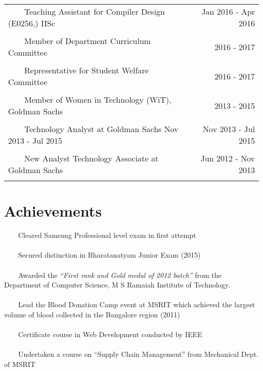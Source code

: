 \documentclass[a4paper,10pt]{article} %
\newcommand{\tabitem}{~~\llap{\textbullet}~~}
\begin{document}
\begin{tabular}{p{12cm}r}
\tabitem Teaching Assistant for Compiler Design (E0256,) IISc  & Jan 2016 - Apr 2016 \\
&\\
\tabitem Member of Department Curriculum Committee &  2016 - 2017\\
&\\
\tabitem Representative for Student Welfare Committee  & 2016 - 2017\\
&\\
\tabitem Member of Women in Technology (WiT), Goldman Sachs  & 2013 - 2015\\
&\\
\tabitem Technology Analyst at Goldman Sachs Nov 2013 - Jul 2015 & Nov 2013 - Jul 2015 \\
&\\
\tabitem New Analyst Technology Associate at Goldman Sachs & Jun 2012 - Nov 2013 \\
&\\
\end{tabular}

\newpage

\section{Achievements}
\tabitem Cleared Samsung Professional level exam in first attempt \\
\\
\tabitem Secured distinction in Bharatanatyam Junior Exam (2015)  \\
\\
\tabitem Awarded the \textit{“First rank and Gold medal of 2012 batch”} from the Department of Computer Science, M S Ramaiah Institute of Technology.\\
\\
\tabitem Lead the Blood Donation Camp event at MSRIT which achieved the largest volume of blood collected in the Bangalore region (2011)\\
\\
\tabitem Certificate course in Web Development conducted by IEEE \\
\\
\tabitem Undertaken a course on “Supply Chain Management” from Mechanical Dept. of MSRIT\\
\\
\end{document}
